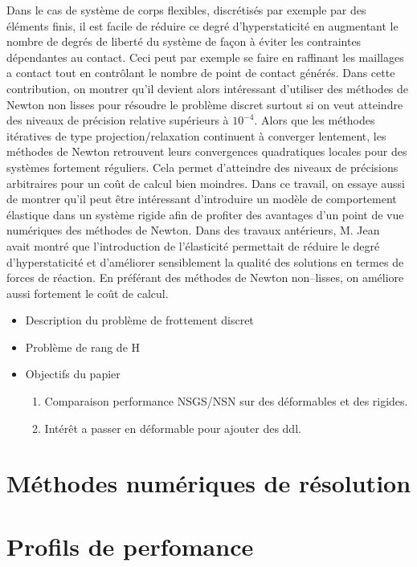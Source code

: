 \documentclass{CSMA2017}
\begin{document}
Dans le cas de système de corps flexibles, discrétisés par exemple par des éléments finis, il est facile de réduire ce degré d'hyperstaticité en augmentant le nombre de degrés de liberté du système de façon à éviter les contraintes dépendantes au contact. Ceci peut par exemple se faire en raffinant les maillages a contact tout en contrôlant le nombre de point de contact générés.
%
Dans cette contribution, on montrer qu'il devient alors intéressant d'utiliser des méthodes de Newton non lisses pour résoudre le problème discret surtout si on veut atteindre des niveaux de précision relative supérieurs à $10^{-4}$.  Alors que les méthodes itératives de type projection/relaxation continuent à converger lentement, les méthodes de Newton retrouvent leurs convergences quadratiques locales pour des systèmes fortement réguliers. Cela permet d'atteindre des niveaux de précisions arbitraires pour un coût de calcul bien moindres. Dans ce travail, on essaye aussi de montrer qu'il peut être intéressant d'introduire  un modèle de comportement élastique dans un système rigide afin de profiter des avantages d'un point de vue numériques des méthodes de Newton. Dans des travaux antérieurs, M. Jean~\cite{Jean1999,Acary.Jean98} avait montré que l'introduction de l'élasticité permettait de réduire le degré d'hyperstaticité et d'améliorer sensiblement la qualité des solutions en termes de forces de réaction. En préférant des méthodes de Newton non--lisses, on améliore aussi fortement le coût de calcul.




\begin{itemize}
\item Description du problème de frottement discret
\item Problème de rang de H
\item Objectifs du papier
  \begin{enumerate}
  \item Comparaison performance NSGS/NSN sur des déformables et des rigides.
  \item Intérêt a passer en déformable pour ajouter des ddl.
  \end{enumerate}
\end{itemize}

\section{Méthodes numériques de résolution}

\section{Profils de perfomance}
\end{document}
